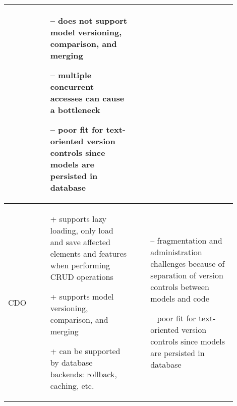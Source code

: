 \begin{table*}[]
\begin{scriptsize}
\begin{tabular}{
        |>{\centering\arraybackslash}m{0.1\linewidth}
        |>{\centering\arraybackslash}m{0.4\linewidth}
        |>{\centering\arraybackslash}m{0.4\linewidth}
        |}
\begin{minipage}[t]{\linewidth}
\begin{itemize}[leftmargin=7pt]
        \end{itemize}
      \end{minipage}
      &
      \begin{minipage}[t]{\linewidth}
        \raggedright
        \begin{itemize}[leftmargin=7pt]
          \setlength
          \item[--] does not support model versioning, comparison, and merging
          \item[--] multiple concurrent accesses can cause a bottleneck
          \item[--] poor fit for text-oriented version controls since models are persisted in database
          \item[]
        \end{itemize}
      \end{minipage}
      \\
      \hline
      CDO
      &
      \begin{minipage}[t]{\linewidth}
        \raggedright
        \begin{itemize}[leftmargin=7pt]
          \setlength
          \item[+] supports lazy loading, only load and save affected elements and features when performing CRUD operations
          \item[+] supports model versioning, comparison, and merging
          \item[+] can be supported by database backends: rollback, caching, etc.
          \item[]
        \end{itemize}
      \end{minipage}
      &
      \begin{minipage}[t]{\linewidth}
        \raggedright
        \begin{itemize}[leftmargin=7pt]
          \setlength
          \item[--] fragmentation and administration challenges because of separation of version controls between models and code
          \item[--] poor fit for text-oriented version controls since models are persisted in database
          \item[]

\end{itemize}
\end{minipage}
\end{tabular}
\end{scriptsize}
\end{table*}
